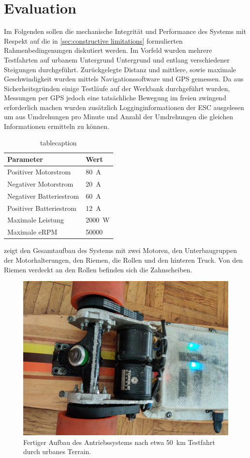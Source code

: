 \chapter{Evaluation}
	Im Folgenden sollen die mechanische Integrität und Performance des Systems mit Respekt auf die in \cref{sec:constructive limitations} formulierten Rahmenbedingenungen diskutiert werden.
	Im Vorfeld wurden mehrere Testfahrten auf urbanem Untergrund Untergrund und entlang verschiedener Steigungen durchgeführt.
	Zurückgelegte Distanz und mittlere, sowie maximale Geschwindigkeit wurden mittels Navigationssoftware und GPS gemessen.
	Da aus Sicherheitsgründen einige Testläufe auf der Werkbank durchgeführt wurden, Messungen per GPS jedoch eine tatsächliche Bewegung im freien zwingend erforderlich machen wurden zusätzlich Logginginformationen der ESC ausgelesen um aus Umdrehungen pro Minute und Anzahl der Umdrehungen die gleichen Informationen ermitteln zu können.\par\medskip
	\begin{table}[h]
		\centering
		\caption{tablecaption}
		\label{tab:esc parameters}
		\begin{tabular}{@{}ll@{}}
			\toprule
			Parameter	& Wert \\
			\midrule
			Positiver Motorstrom	& \qty{80}{\ampere} \\
			Negativer Motorstrom	& \qty{20}{\ampere} \\
			Negativer Batteriestrom & \qty{60}{\ampere} \\
			Positiver Batteriestrom & \qty{12}{\ampere} \\
			Maximale Leistung		& \qty{2000}{\watt} \\
			Maximale eRPM			& \num{50000} \\
			\bottomrule
		\end{tabular}
	\end{table}
	 zeigt den Gesamtaufbau des Systems mit zwei Motoren, den Unterbaugruppen der Motorhalterungen, den Riemen, die Rollen und den hinteren Truck.
	Von den Riemen verdeckt an den Rollen befinden sich die Zahnscheiben.
	\begin{figure}[h]
		\centering
		\includegraphics[angle=180, width=.8\textwidth]{Footage/Pictures/Drivetrain close up v2.jpg}
		\caption[Fertiger Aufbau des Antriebssystems]{Fertiger Aufbau des Antriebssystems nach etwa \qty{50}{\kilo\metre} Testfahrt durch urbanes Terrain.}
		\label{fig:real world assembly}
	\end{figure}


